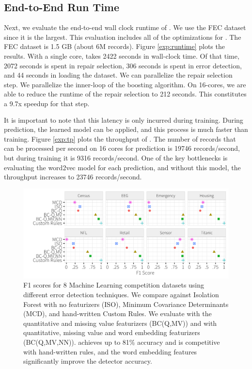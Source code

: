\subsection{End-to-End Run Time}
Next, we evaluate the end-to-end wall clock runtime of \sys. We use the FEC dataset since it is the largest. This evaluation includes all of the optimizations for \sys. The FEC dataset is 1.5 GB (about 6M records). 
Figure \ref{exp:runtime} plots the results.
With a single core, \sys takes 2422 seconds in wall-clock time. Of that time, 2072 seconds is spent in repair selection, 306 seconds is spent in error detection, and 44 seconds in loading the dataset.
We can parallelize the repair selection step. We parallelize the inner-loop of the boosting algorithm. On 16-cores, we are able to reduce the runtime of the repair selection to 212 seconds. This constitutes a 9.7x speedup for that step.

It is important to note that this latency is only incurred during training. During prediction, the learned model can be applied, and this process is much faster than training. 
Figure \ref{exp:tp} plots the throughput of \sys.
The number of records that can be processed per second on 16 cores for prediction is 19746 records/second, but during training it is 9316 records/second. One of the key bottlenecks is evaluating the word2vec model for each prediction, and without this model, the throughput increases to 23746 records/second.

\begin{figure}[t]
\centering
 \includegraphics[width=\columnwidth]{exp/daccuracy.png}
 \caption{F1 scores for 8 Machine Learning competition datasets using different error detection techniques. We compare against Isolation Forest with no featurizers (ISO), Minimum Covariance Determinants (MCD), and hand-written Custom Rules.  We evaluate \sys with the quantitative and missing value featurizers (BC(Q,MV)) and with quantitative, missing value and word embedding featurizers (BC(Q,MV,NN)).  \sys achieves up to 81\% accuracy and is competitive with hand-written rules, and the word embedding features significantly improve the detector accuracy.
 \label{fig:derror}}
\end{figure}


